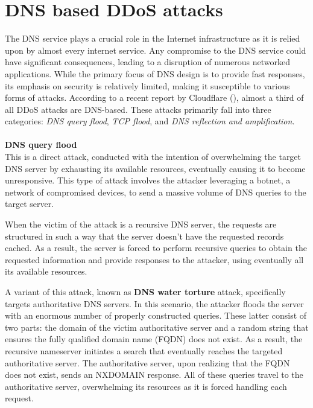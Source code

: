 \section{DNS based DDoS attacks}
The DNS service plays a crucial role in the Internet infrastructure as it is relied upon by almost every internet service. 
Any compromise to the DNS service could have significant consequences, leading to a disruption of numerous networked applications. 
While the primary focus of DNS design is to provide fast responses, its emphasis on security is relatively limited, making 
it susceptible to various forms of attacks. According to a recent report by Cloudflare (\cite{DDoSthreatreport}), almost a third
of all DDoS attacks are DNS-based. These attacks primarily fall into three categories:
\textit{DNS query flood}, \textit{TCP flood}, and \textit{DNS reflection and amplification}.\\
\\
\textbf{DNS query flood}\\
This is a direct attack, conducted with the intention of overwhelming the target DNS server by exhausting its available resources, 
eventually causing it to become unresponsive. This type of attack involves the attacker leveraging a botnet, a network of 
compromised devices, to send a massive volume of DNS queries to the target server.

When the victim of the attack is a recursive DNS server, the requests are structured in such a way that the server doesn't 
have the requested records cached. As a result, the server is forced to perform recursive queries to obtain the requested 
information and provide responses to the attacker, using eventually all its available resources.

A variant of this attack, known as \textbf{DNS water torture} attack, specifically targets authoritative DNS servers. 
In this scenario, the attacker floods the server with an enormous number of properly constructed queries.
These latter consist of two parts: the domain of the victim authoritative server and a random 
string that ensures the fully qualified domain name (FQDN) does not exist. As a result, the recursive nameserver initiates 
a search that eventually reaches the targeted authoritative server. The authoritative server, upon realizing that the FQDN 
does not exist, sends an NXDOMAIN response. All of these queries travel to the authoritative server, overwhelming its 
resources as it is forced handling each request.


